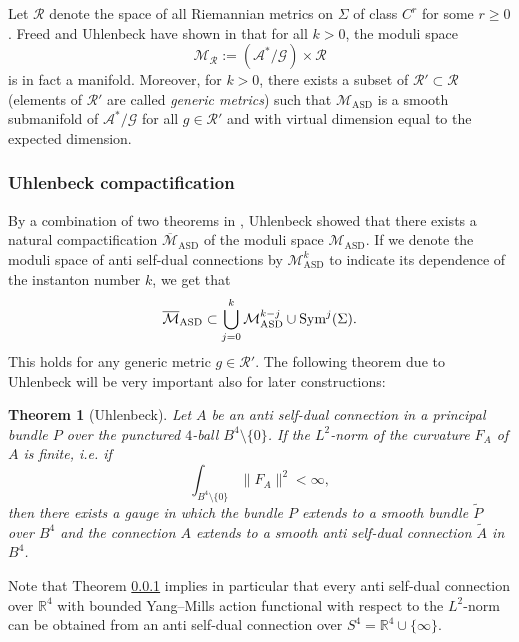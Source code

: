 \documentclass[11pt,colorinlistoftodos]{amsart}
\numberwithin{equation}{subsection}
\theoremstyle{plain}
\newtheorem{thm}{Theorem}[subsection]
\theoremstyle{definition}
\theoremstyle{remark}
\newcommand{\R}{\mathbb{R}}
\newcommand{\calM}{\mathcal{M}}
\newcommand{\Sym}{\textnormal{Sym}}
\begin{document}
Let $\mathcal{R}$ denote the space of all Riemannian metrics on $\Sigma$ of class $C^r$ for some $r\geq0$. Freed and Uhlenbeck have shown in \cite{FreedUhlenbeck1984} that for all $k>0$, the moduli space 
\[
\calM_\mathcal{R}:=(\mathcal{A}^*/\mathcal{G})\times \mathcal{R}
\]
is in fact a manifold. Moreover, for $k>0$, there exists a subset of $\mathcal{R}'\subset\mathcal{R}$ (elements of $\mathcal{R}'$ are called \emph{generic metrics}) such that $\calM_{\mathrm{ASD}}$ is a smooth submanifold of $\mathcal{A}^*/\mathcal{G}$ for all $g\in\mathcal{R}'$ and with virtual dimension equal to the expected dimension.

\subsubsection{Uhlenbeck compactification}
\label{thm:Uhlenbeck_removable_singularities}
By a combination of two theorems in \cite{Uhlenbeck1982,Uhlenbeck1982b}, Uhlenbeck showed that there exists a natural compactification $\overline{\calM}_{\mathrm{ASD}}$ of the moduli space $\calM_{\mathrm{ASD}}$. If we denote the moduli space of anti self-dual connections by $\calM_\mathrm{ASD}^k$ to indicate its dependence of the instanton number $k$, we get that
\begin{equation}
    \label{eq:Uhlenbeck_compactification}
    \overline{\calM}_\mathrm{ASD}\subset \bigcup_{j=0}^k \calM_{\mathrm{ASD}}^{k-j}\cup\Sym^j(\Sigma).
\end{equation}
This holds for any generic metric $g\in\mathcal{R}'$. The following theorem due to Uhlenbeck will be very important also for later constructions:

\begin{thm}[Uhlenbeck\cite{Uhlenbeck1982b}]
Let $A$ be an anti self-dual connection in a principal bundle $P$ over the punctured $4$-ball $B^4\setminus\{0\}$. If the $L^2$-norm of the curvature $F_A$ of $A$ is finite, i.e. if 
\[
\int_{B^4\setminus\{0\}}\|F_A\|^2<\infty,
\]
then there exists a gauge in which the bundle $P$ extends to a smooth bundle $\widetilde{P}$ over $B^4$ and the connection $A$ extends to a smooth anti self-dual connection $\widetilde{A}$ in $B^4$.
\end{thm}

Note that Theorem \ref{thm:Uhlenbeck_removable_singularities} implies in particular that every anti self-dual connection over $\R^4$ with bounded Yang--Mills action functional with respect to the $L^2$-norm can be obtained from an anti self-dual connection over $S^4=\R^4\cup\{\infty\}$.
\end{document}
